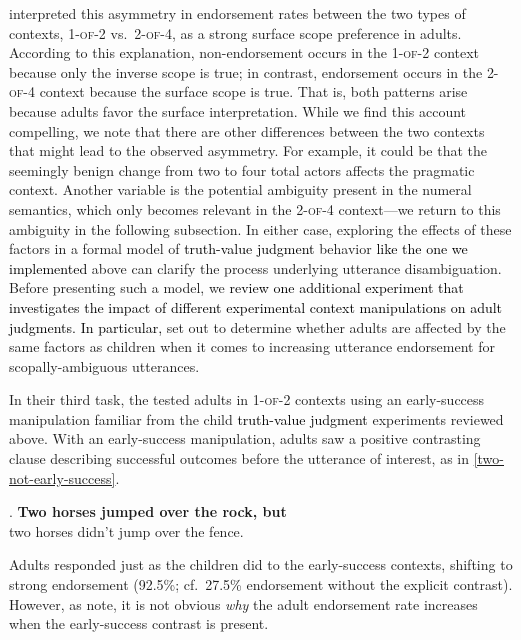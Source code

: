 \documentclass[cm]{glossa}
\newcommand{\lp}[1]{\textcolor{black}{#1}} %
\begin{document}
\citeauthor{musolinolidz2003} interpreted this asymmetry in endorsement rates between the two types of contexts, \textsc{1-of-2} vs.~\textsc{2-of-4}, as a strong {surface} scope preference in adults. According to this explanation,  non-endorsement occurs in the \textsc{1-of-2} context because only the {inverse} scope is true; in contrast, endorsement occurs in the \textsc{2-of-4} context because the {surface} scope is true. That is, both patterns arise because adults favor the {surface} interpretation. While we find this account compelling, we note that there are other differences between the two contexts that might lead to the observed asymmetry. For example, it could be that the seemingly benign change from two to four total actors affects the pragmatic context. Another variable is the potential ambiguity present in the numeral semantics, which only becomes relevant in the \textsc{2-of-4} context---we return to this ambiguity in the following subsection. In either case, exploring the effects of these factors in a formal model of 
\lp{truth-value judgment}
behavior \lp{like the one we implemented} above can clarify the process underlying utterance disambiguation. Before presenting such a model, we \lp{review one additional experiment}
\lp{that investigates the impact of different experimental context manipulations on adult judgments.}
\lp{In particular, }
\citeauthor{musolinolidz2003} set out to determine whether adults are affected by the same factors as children when it comes to increasing utterance endorsement for scopally-ambiguous utterances. 

In their third task, the \citeauthor{musolinolidz2003} tested adults in  \textsc{1-of-2} contexts using an early-success manipulation familiar from the child 
\lp{truth-value judgment}
experiments reviewed above. With an early-success manipulation, adults saw a positive contrasting clause describing successful outcomes before the utterance of interest, as in \ref{two-not-early-success}.

\ex. \label{two-not-early-success} \textbf{{Two horses jumped over the rock, but}} \\
{two horses didn't jump over the fence.}

Adults responded just as the children did to the early-success contexts, shifting to strong endorsement (92.5\%; cf.~27.5\% endorsement without the explicit contrast).  However, as \citeauthor{musolinolidz2003} note, it is not obvious \emph{why} the adult endorsement rate increases when the early-success contrast is present. 
\end{document}
